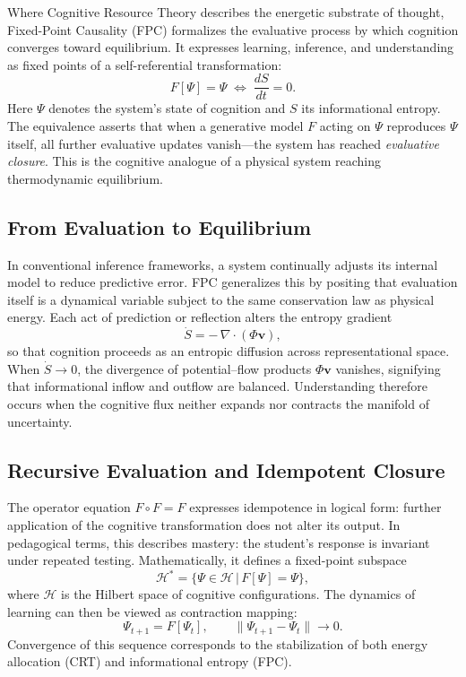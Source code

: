 \documentclass[12pt,a4paper]{article}
\begin{document}
Where Cognitive Resource Theory describes the energetic substrate of thought,
Fixed-Point Causality (FPC) formalizes the evaluative process by which cognition converges toward equilibrium.
It expresses learning, inference, and understanding as fixed points of a self-referential transformation:
\begin{equation}
F[\Psi]=\Psi
\;\Longleftrightarrow\;
\frac{dS}{dt}=0.
\end{equation}
Here $\Psi$ denotes the system’s state of cognition and $S$ its informational entropy.
The equivalence asserts that when a generative model $F$ acting on $\Psi$ reproduces $\Psi$ itself, all further evaluative updates vanish—the system has reached
\emph{evaluative closure}.
This is the cognitive analogue of a physical system reaching thermodynamic equilibrium.

\subsection{From Evaluation to Equilibrium}

In conventional inference frameworks, a system continually adjusts its internal model to reduce predictive error.
FPC generalizes this by positing that evaluation itself is a dynamical variable subject to the same conservation law as physical energy.
Each act of prediction or reflection alters the entropy gradient
\[
\dot{S} = -\,\nabla\!\cdot(\Phi\mathbf{v}),
\]
so that cognition proceeds as an entropic diffusion across representational space.
When $\dot{S}\!\to\!0$, the divergence of potential–flow products $\Phi\mathbf{v}$ vanishes,
signifying that informational inflow and outflow are balanced.
Understanding therefore occurs when the cognitive flux neither expands nor contracts the manifold of uncertainty.

\subsection{Recursive Evaluation and Idempotent Closure}

The operator equation $F\!\circ F=F$ expresses idempotence in logical form:
further application of the cognitive transformation does not alter its output.
In pedagogical terms, this describes mastery: the student’s response is invariant under repeated testing.
Mathematically, it defines a fixed-point subspace
\[
\mathcal{H}^*=\{\Psi\in\mathcal{H}\,|\,F[\Psi]=\Psi\},
\]
where $\mathcal{H}$ is the Hilbert space of cognitive configurations.
The dynamics of learning can then be viewed as contraction mapping:
\[
\Psi_{t+1}=F[\Psi_t], \qquad
\|\Psi_{t+1}-\Psi_t\|\to 0.
\]
Convergence of this sequence corresponds to the stabilization of both energy allocation (CRT) and informational entropy (FPC).
\end{document}

